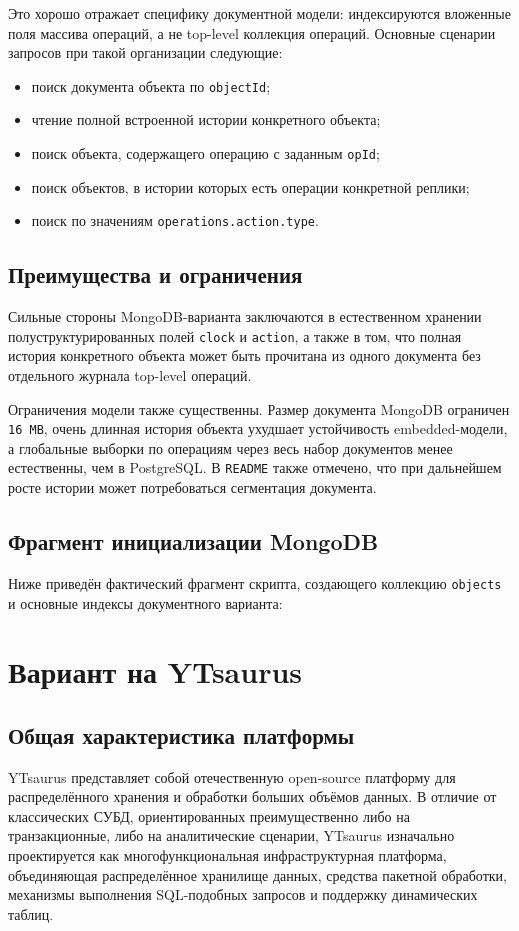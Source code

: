 \documentclass[a4paper,14pt]{extarticle}
\def\uppercase#1{#1}%
\def\makefirstuc#1{#1}%
\def\normalsize{}%
\newcommand{\withnumber}[1]{%
    \clearpage
    \section{\uppercase{#1}}
}
\newcommand{\mysubsection}[1]{%
    \subsection{\normalsize\makefirstuc{#1}}
}
\newcommand{\codeexample}[3]{%
    
}
\begin{document}
Это хорошо отражает специфику документной модели: индексируются вложенные поля
массива операций, а не top-level коллекция операций. Основные сценарии запросов
при такой организации следующие:
\begin{itemize}[leftmargin=1.25cm]
    \item поиск документа объекта по \texttt{objectId};
    \item чтение полной встроенной истории конкретного объекта;
    \item поиск объекта, содержащего операцию с заданным \texttt{opId};
    \item поиск объектов, в истории которых есть операции конкретной реплики;
    \item поиск по значениям \texttt{operations.action.type}.
\end{itemize}

\mysubsection{Преимущества и ограничения}

Сильные стороны MongoDB-варианта заключаются в естественном хранении
полуструктурированных полей \texttt{clock} и \texttt{action}, а также в том,
что полная история конкретного объекта может быть прочитана из одного документа
без отдельного журнала top-level операций.

Ограничения модели также существенны. Размер документа MongoDB ограничен
\texttt{16 MB}, очень длинная история объекта ухудшает устойчивость embedded-модели,
а глобальные выборки по операциям через весь набор документов менее естественны,
чем в PostgreSQL. В \texttt{README} также отмечено, что при дальнейшем росте
истории может потребоваться сегментация документа.

\mysubsection{Фрагмент инициализации MongoDB}

Ниже приведён фактический фрагмент скрипта, создающего коллекцию \texttt{objects}
и основные индексы документного варианта:

\codeexample{../mongodb/initdb/001_init.js}{JavaScript}{Скрипт инициализации MongoDB}

\withnumber{Вариант на YTsaurus}

\mysubsection{Общая характеристика платформы}

YTsaurus представляет собой отечественную open-source платформу для
распределённого хранения и обработки больших объёмов данных. В отличие от
классических СУБД, ориентированных преимущественно либо на транзакционные,
либо на аналитические сценарии, YTsaurus изначально проектируется как
многофункциональная инфраструктурная платформа, объединяющая распределённое
хранилище данных, средства пакетной обработки, механизмы выполнения
SQL-подобных запросов и поддержку динамических таблиц.
\end{document}
